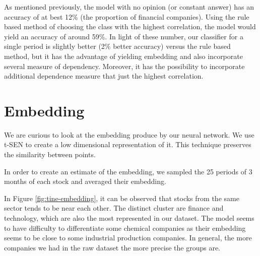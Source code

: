 \documentclass[a4paper,twoside]{article}
\begin{document}
As mentioned previously, the model with no opinion (or constant answer) has
an accuracy of at best 12\% (the proportion of financial companies). Using the
rule based method of choosing the class with the highest correlation, the
model would yield an accuracy of around 59\%. In light of these number, our
classifier for a single period is slightly better (2\% better accuracy) versus
the rule based method, but it has the advantage of yielding embedding and
also incorporate several measure of dependency. Moreover, it has the
possibility to incorporate additional dependence measure that just the
highest correlation.

\section{Embedding}
\label{sec:org6a416c4}

We are curious to look at the embedding produce by our neural network. We use
t-SEN to create a low dimensional representation of it. This technique
preserves the similarity between points.

In order to create an estimate of the embedding, we sampled the 25 periods of
3 months of each stock and averaged their embedding. 

In Figure \ref{fig:tine-embedding}, it can be observed that stocks from the
same sector tends to be near each other. The distinct cluster are finance and
technology, which are also the most represented in our dataset. The model
seems to have difficulty to differentiate some chemical companies as their
embedding seems to be close to some industrial production companies. In
general, the more companies we had in the raw dataset the more precise the
groups are.
\end{document}
